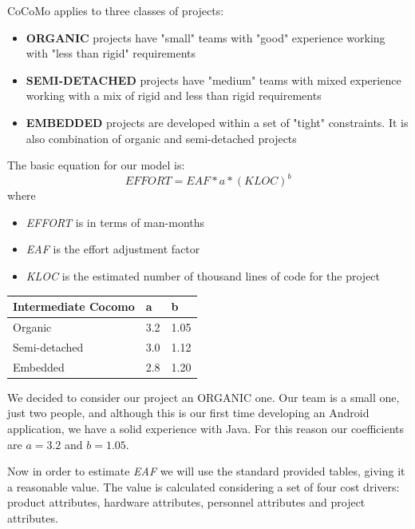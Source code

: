 \documentclass[a4paper]{scrreprt}
\begin{document}
\bigskip\noindent CoCoMo applies to three classes of projects:
\begin{itemize}
	\item \textbf{ORGANIC} projects have "small" teams with "good" experience working with "less than rigid" requirements
	\item \textbf{SEMI-DETACHED} projects have "medium" teams with mixed experience working with a mix of rigid and less than rigid requirements
	\item \textbf{EMBEDDED} projects are developed within a set of "tight" constraints. It is also combination of organic and semi-detached projects
\end{itemize}

The basic equation for our model is:
\[ EFFORT = EAF * a * (KLOC)^b  \]
where
\begin{itemize}
	\item \emph{EFFORT} is in terms of man-months
	\item \emph{EAF} is the effort adjustment factor
	\item \emph{KLOC} is the estimated number of thousand lines of code for the project
\end{itemize}

\bigskip
\noindent
\begin{tabularx}{\linewidth}{|X|l|l|}
	\hline
	\textbf{Intermediate Cocomo}	&\textbf{a}	&\textbf{b} \\ \hline
	Organic & 3.2 & 1.05 \\ \hline
	Semi-detached & 3.0 & 1.12 \\ \hline
	Embedded & 2.8 & 1.20 \\ \hline
\end{tabularx}
\bigskip

We decided to consider our project an ORGANIC one. Our team is a small one, just two people, and although this is our first time developing an Android application, we have a solid experience with Java. For this reason our coefficients are $ a = 3.2 $ and $ b = 1.05 $.

\bigskip Now in order to estimate \emph{EAF} we will use the standard provided tables, giving it a reasonable value. The value is calculated considering a set of four cost drivers: product attributes, hardware attributes, personnel attributes and project attributes.
\end{document}
